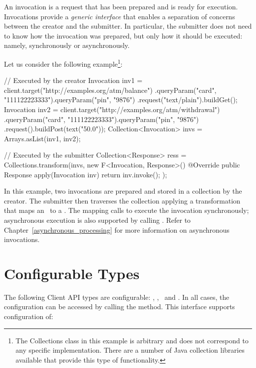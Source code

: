 An invocation is a request that has been prepared and is ready for execution. Invocations provide a {\em generic interface} that enables a separation of concerns between the creator and the submitter. In particular, the submitter does not need to know how the invocation was prepared, but only how it should be executed: namely, synchronously or asynchronously.

 Let us consider the following example\footnote{The Collections class in this example is arbitrary and does not correspond to any specific implementation. There are a number of Java collection libraries available that provide this type of functionality.}:

\begin{listing}{1}
// Executed by the creator
Invocation inv1 = client.target("http://examples.org/atm/balance")
    .queryParam("card", "111122223333").queryParam("pin", "9876")
    .request("text/plain").buildGet();
Invocation inv2 = client.target("http://examples.org/atm/withdrawal")
    .queryParam("card", "111122223333").queryParam("pin", "9876")
    .request().buildPost(text("50.0"));
Collection<Invocation> invs = Arrays.asList(inv1, inv2);

// Executed by the submitter
Collection<Response> ress =
    Collections.transform(invs,
        new F<Invocation, Response>() {
             @Override
             public Response apply(Invocation inv) {
                 return inv.invoke(); } });
\end{listing}

In this example, two invocations are prepared and stored in a collection by the creator. The submitter then traverses the collection applying a transformation that maps an \Invocation\ to a \Response. The mapping calls  to execute the invocation synchronously; asynchronous execution is also supported by calling . Refer to
Chapter~\ref{asynchronous_processing} for more information on asynchronous invocations.

\section{Configurable Types}
\label{configurable_types}

The following Client API types are configurable: \Client, \Invocation, \InvocationBuilder\ and \WebTarget. In all cases, the configuration can be accessed by calling the  method. This interface supports configuration of:

